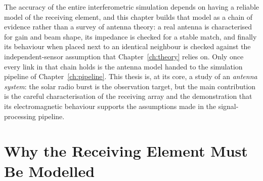 The accuracy of the entire interferometric simulation depends on having a
reliable model of the receiving element, and this chapter builds that model
as a chain of evidence rather than a survey of antenna theory: a real
antenna is characterised for gain and beam shape, its impedance is checked
for a stable match, and finally its behaviour when placed next to an
identical neighbour is checked against the independent-sensor assumption
that Chapter~\ref{ch:theory} relies on. Only once every link in that chain
holds is the antenna model handed to the simulation pipeline of
Chapter~\ref{ch:pipeline}. This thesis is, at its core, a study of an
\emph{antenna system}: the solar radio burst is the observation target, but
the main contribution is the careful characterisation of the receiving array
and the demonstration that its electromagnetic behaviour supports the
assumptions made in the signal-processing pipeline.

\section{Why the Receiving Element Must Be Modelled}
\label{sec:why-model}

